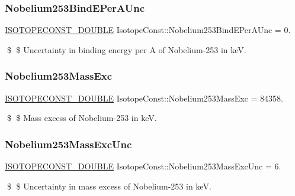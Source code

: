 \subsubsection{\texorpdfstring{Nobelium253\+Bind\+E\+Per\+A\+Unc}{Nobelium253BindEPerAUnc}}
{\footnotesize\ttfamily \mbox{\hyperlink{group___isotope_const-_macros_ga8f45a7272ce02c0b4c65c44636ed719a}{I\+S\+O\+T\+O\+P\+E\+C\+O\+N\+S\+T\+\_\+\+D\+O\+U\+B\+LE}} Isotope\+Const\+::\+Nobelium253\+Bind\+E\+Per\+A\+Unc = 0.}

\$ \$ Uncertainty in binding energy per A of Nobelium-\/253 in keV. \mbox{\label{group___isotope_const-_nobelium-_no253_gaf6b1bfb31a91c75ddfeb39b2dc676919}} 
\subsubsection{\texorpdfstring{Nobelium253\+Mass\+Exc}{Nobelium253MassExc}}
{\footnotesize\ttfamily \mbox{\hyperlink{group___isotope_const-_macros_ga8f45a7272ce02c0b4c65c44636ed719a}{I\+S\+O\+T\+O\+P\+E\+C\+O\+N\+S\+T\+\_\+\+D\+O\+U\+B\+LE}} Isotope\+Const\+::\+Nobelium253\+Mass\+Exc = 84358.}

\$ \$ Mass excess of Nobelium-\/253 in keV. \mbox{\label{group___isotope_const-_nobelium-_no253_ga5f6e6112aa46842f827844be231c1cf3}} 
\subsubsection{\texorpdfstring{Nobelium253\+Mass\+Exc\+Unc}{Nobelium253MassExcUnc}}
{\footnotesize\ttfamily \mbox{\hyperlink{group___isotope_const-_macros_ga8f45a7272ce02c0b4c65c44636ed719a}{I\+S\+O\+T\+O\+P\+E\+C\+O\+N\+S\+T\+\_\+\+D\+O\+U\+B\+LE}} Isotope\+Const\+::\+Nobelium253\+Mass\+Exc\+Unc = 6.}

\$ \$ Uncertainty in mass excess of Nobelium-\/253 in keV. \mbox{\label{group___isotope_const-_nobelium-_no253_gaad94cef0e5f259b9ffb87837c8634e96}} 
